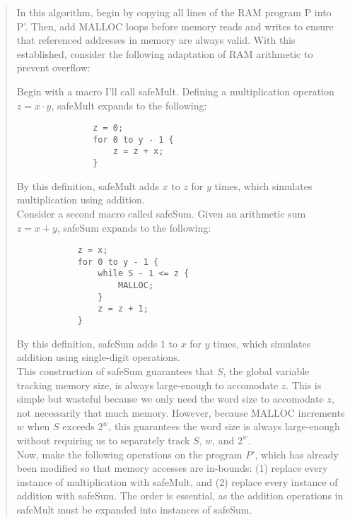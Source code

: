 \documentclass[11pt]{article}
\begin{document}
\begin{enumerate}
\begin{enumerate}
\begin{quote}
          In this algorithm, begin by copying all lines of the RAM program P into P'. Then, add MALLOC loops before memory reads and writes to ensure that referenced addresses in memory are always valid. With this established, consider the following adaptation of RAM arithmetic to prevent overflow:  \\
\newpage

           Begin with a macro I'll call \textsf{safeMult}. Defining a multiplication operation $z = x \cdot y$, \textsf{safeMult} expands to the following: 
           \begin{lstlisting}
               z = 0;
               for 0 to y - 1 {
                   z = z + x;
               }
           \end{lstlisting}
            By this definition, \textsf{safeMult} adds $x$ to $z$ for $y$ times, which simulates multiplication using addition. \\

          Consider a second macro called \textsf{safeSum}. Given an arithmetic sum $z = x + y$, \textsf{safeSum} expands to the following: 
          \begin{lstlisting}
            z = x; 
            for 0 to y - 1 {
                while S - 1 <= z {
                    MALLOC;
                }
                z = z + 1;
            }
          \end{lstlisting}
            By this definition, \textsf{safeSum} adds $1$ to $x$ for $y$ times, which simulates addition using single-digit operations. \\
            
           This construction of \textsf{safeSum} guarantees that $S$, the global variable tracking memory size, is always large-enough to accomodate $z$. This is simple but wasteful because we only need the word size to accomodate $z$, not necessarily that much memory. However, because MALLOC increments $w$ when $S$ exceeds $2^w$, this guarantees the word size is always large-enough without requiring us to separately track $S$, $w$, and $2^w$. \\ 

        Now, make the following operations on the program $P'$, which has already been modified so that memory accesses are in-bounds: (1) replace every instance of multiplication with \textsf{safeMult}, and (2) replace every instance of addition with \textsf{safeSum}. The order is essential, as the addition operations in \textsf{safeMult} must be expanded into instances of \textsf{safeSum}. \\


\end{quote}
\end{enumerate}
\end{enumerate}
\end{document}
